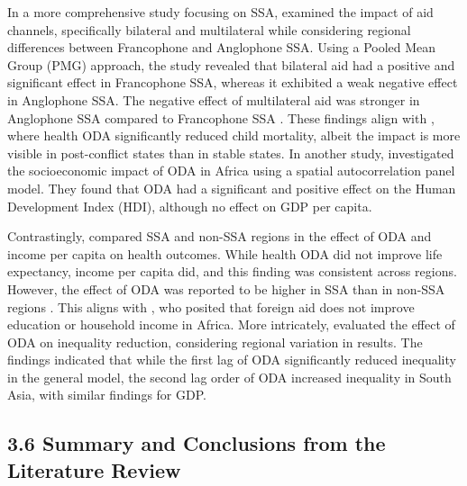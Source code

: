In a more comprehensive study focusing on SSA, \textcite{nwude_impact_2023} examined the impact of aid channels, specifically bilateral and multilateral while considering regional differences between Francophone and Anglophone SSA. Using a Pooled Mean Group (PMG) approach, the study revealed that bilateral aid had a positive and significant effect in Francophone SSA, whereas it exhibited a weak negative effect in Anglophone SSA. The negative effect of multilateral aid was stronger in Anglophone SSA compared to Francophone SSA \parencite{nwude_impact_2023}. These findings align with \textcite{yogo_health_2015}, where health ODA significantly reduced child mortality, albeit the impact is more visible in post-conflict states than in stable states. In another study, \textcite{chung_economic_2022} investigated the socioeconomic impact of ODA in Africa using a spatial autocorrelation panel model. They found that ODA had a significant and positive effect on the Human Development Index (HDI), although no effect on GDP per capita.

Contrastingly, \textcite{nwude_official_2020} compared SSA and non-SSA regions in the effect of ODA and income per capita on health outcomes. While health ODA did not improve life expectancy, income per capita did, and this finding was consistent across regions. However, the effect of ODA was reported to be higher in SSA than in non-SSA regions \parencite{nwude_official_2020}. This aligns with \textcite{staicu2017study, gama_health_2015}, who posited that foreign aid does not improve education or household income in Africa. More intricately, \textcite{shafiullah_foreign_2011} evaluated the effect of ODA on inequality reduction, considering regional variation in results. The findings indicated that while the first lag of ODA significantly reduced inequality in the general model, the second lag order of ODA increased inequality in South Asia, with similar findings for GDP. 

\subsection*{3.6 Summary and Conclusions from the Literature Review}
